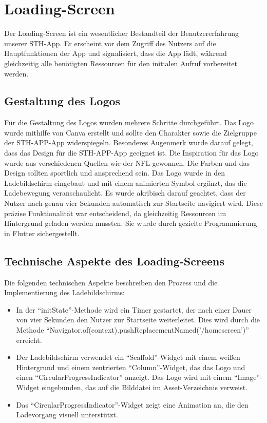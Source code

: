 \chapter{Loading-Screen}
Der Loading-Screen ist ein wesentlicher Bestandteil der Benutzererfahrung unserer STH-App. Er erscheint vor dem Zugriff des Nutzers auf die Hauptfunktionen der App und signalisiert, dass die App lädt, während gleichzeitig alle benötigten Ressourcen für den initialen Aufruf vorbereitet werden.

\section{Gestaltung des Logos}
Für die Gestaltung des Logos wurden mehrere Schritte durchgeführt. Das Logo wurde mithilfe von Canva erstellt und sollte den Charakter sowie die Zielgruppe der STH-APP-App widerspiegeln.
Besonderes Augenmerk wurde darauf gelegt, dass das Design für die STH-APP-App geeignet ist. Die Inspiration für das Logo wurde aus verschiedenen Quellen wie der NFL gewonnen. Die Farben und das Design sollten sportlich und ansprechend sein.
Das Logo wurde in den Ladebildschirm eingebaut und mit einem animierten Symbol ergänzt, das die Ladebewegung veranschaulicht. 
Es wurde akribisch darauf geachtet, dass der Nutzer nach genau vier Sekunden automatisch zur Startseite navigiert wird. Diese präzise Funktionalität war entscheidend, da gleichzeitig Ressourcen im Hintergrund geladen werden mussten. Sie wurde durch gezielte Programmierung in Flutter sichergestellt.

\section{Technische Aspekte des Loading-Screens}
Die folgenden technischen Aspekte beschreiben den Prozess und die Implementierung des Ladebildschirms:

\begin{itemize}[itemsep=0pt]
    \item In der \enquote{initState}-Methode wird ein Timer gestartet, der nach einer Dauer von vier Sekunden den Nutzer zur Startseite weiterleitet. Dies wird durch die Methode \enquote{Navigator.of(context).pushReplacementNamed('/homescreen')} erreicht.
    \item Der Ladebildschirm verwendet ein \enquote{Scaffold}-Widget mit einem weißen Hintergrund und einem zentrierten \enquote{Column}-Widget, das das Logo und einen \enquote{CircularProgressIndicator} anzeigt. Das Logo wird mit einem \enquote{Image}-Widget eingebunden, das auf die Bilddatei im Asset-Verzeichnis verweist.
    \item Das \enquote{CircularProgressIndicator}-Widget zeigt eine Animation an, die den Ladevorgang visuell unterstützt.
\end{itemize}

